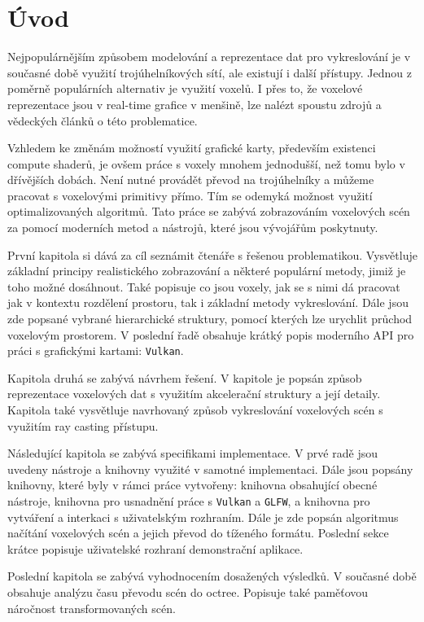 \chapter{Úvod}
\label{uvod}
Nejpopulárnějším způsobem modelování a reprezentace dat pro vykreslování je v současné době využití trojúhelníkových sítí, ale existují i další přístupy. Jednou z poměrně populárních alternativ je využití voxelů. I přes to, že voxelové reprezentace jsou v real-time grafice v menšině, lze nalézt spoustu zdrojů a vědeckých článků o této problematice. 

Vzhledem ke změnám možností využití grafické karty, především existenci compute shaderů, je ovšem práce s voxely mnohem jednodušší, než tomu bylo v dřívějších dobách. Není nutné provádět převod na trojúhelníky a můžeme pracovat s voxelovými primitivy přímo. Tím se odemyká možnost využití optimalizovaných algoritmů. Tato práce se zabývá zobrazováním voxelových scén za pomocí moderních metod a nástrojů, které jsou vývojářům poskytnuty.

První kapitola si dává za cíl seznámit čtenáře s řešenou problematikou. Vysvětluje základní principy realistického zobrazování a některé populární metody, jimiž je toho možné dosáhnout. Také popisuje co jsou voxely, jak se s nimi dá pracovat jak v kontextu rozdělení prostoru, tak i základní metody vykreslování. Dále jsou zde popsané vybrané hierarchické struktury, pomocí kterých lze urychlit průchod voxelovým prostorem. V poslední řadě obsahuje krátký popis moderního API pro práci s grafickými kartami: \texttt{Vulkan}.

Kapitola druhá se zabývá návrhem řešení. V kapitole je popsán způsob reprezentace voxelových dat s využitím akcelerační struktury a její detaily. Kapitola také vysvětluje navrhovaný způsob vykreslování voxelových scén s využitím ray casting přístupu.

Následující kapitola se zabývá specifikami implementace. V prvé radě jsou uvedeny nástroje a knihovny využité v samotné implementaci. Dále jsou popsány knihovny, které byly v rámci práce vytvořeny: knihovna obsahující obecné nástroje, knihovna pro usnadnění práce s \texttt{Vulkan} a \texttt{GLFW}, a knihovna pro vytváření a interkaci s uživatelským rozhraním. Dále je zde popsán algoritmus načítání voxelových scén a jejich převod do tíženého formátu. Poslední sekce krátce popisuje uživatelské rozhraní demonstrační aplikace.

Poslední kapitola se zabývá vyhodnocením dosažených výsledků. V současné době obsahuje analýzu času převodu scén do octree. Popisuje také paměťovou náročnost transformovaných scén.

